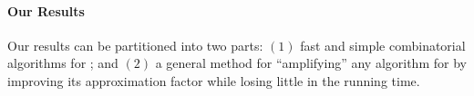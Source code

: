 \documentclass[a4paper]{article}
\begin{document}


%
%

\paragraph*{Our Results}
Our results can be partitioned into two parts: $(1)$ fast and simple combinatorial algorithms for \SK; and $(2)$ a general method for ``amplifying'' any algorithm for \SK by improving its approximation factor while losing little in the running time.
\end{document}
